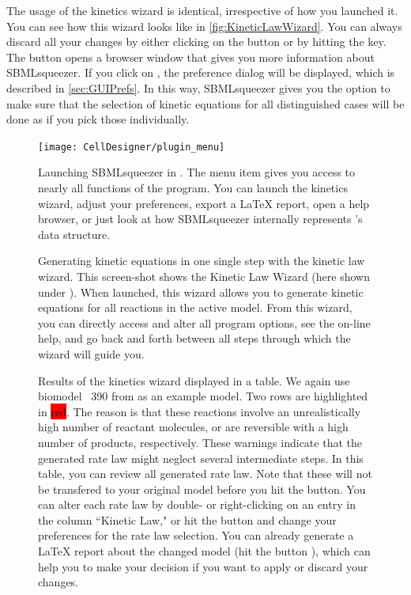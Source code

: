 The usage of the kinetics wizard is identical, irrespective of how you launched it.
You can see how this wizard looks like in \vref{fig:KineticLawWizard}.
You can always discard all your changes by either clicking on the  button or by hitting the \keys{\escwin} key.
The  button opens a browser window that gives you more information about SBMLsqueezer.
If you click on , the preference dialog will be displayed, which is described in \vref{sec:GUIPrefs}.
In this way, SBMLsqueezer gives you the option to make sure that the selection of kinetic equations for all distinguished cases will be done as if you pick those individually.
\begin{figure}
\texttt{[image: CellDesigner/plugin\_menu]}
\caption[Launching SBMLsqueezer in \CellDesigner]{Launching SBMLsqueezer in \CellDesigner.
The menu item  gives you access to nearly all functions of the program.
You can launch the kinetics wizard, adjust your preferences, export a \LaTeX{} report, open a help browser, or just look at how SBMLsqueezer internally represents \CellDesigner's data structure.}
\label{fig:PluginMenu}
\end{figure}
\begin{figure}[b!]
\caption[Generating kinetic equations in one single step with the kinetic law wizard]{Generating kinetic equations in one single step with the kinetic law wizard.
This screen-shot shows the Kinetic Law Wizard (here shown under \MacOSX).
When launched, this wizard allows you to generate kinetic equations for all reactions in the active model.
From this wizard, you can directly access and alter all program options, see the on-line help, and go back and forth between all steps through which the wizard will guide you.}
\label{fig:KineticLawWizard}
\end{figure}
\begin{figure}[t!]
\caption[Results of the kinetics wizard displayed in a table]{Results of the kinetics wizard displayed in a table.
We again use biomodel \numero~390 from \BioModels \citep{Li2010a, Arnold2011} as an example model.
Two rows are highlighted in \colorbox{red}{red}.
The reason is that 
these reactions involve an unrealistically high number of reactant molecules, or are reversible with a high number of products, respectively.
These warnings indicate that the generated rate law might neglect several intermediate steps.
In this table, you can review all generated rate law.
Note that these will not be transfered to your original model before you hit the  button.
You can alter each rate law by double- or right-clicking on an entry in the column ``Kinetic Law," or hit the  button and change your preferences for the rate law selection.
You can already generate a \LaTeX{} report about the changed model (hit the button ), which can help you to make your decision if you want to apply or discard your changes.}
\label{fig:wizard_results_table}
\end{figure}

